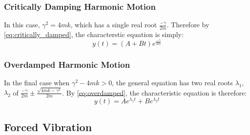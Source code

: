 \documentclass[11pt]{article} %
\begin{document}
\begin{multicols}{2}
\subsubsection {Critically Damping Harmonic Motion}
In this case, ${\gamma}^2 = 4mk$, which has a single real root $\frac{-\gamma}{2m}$. Therefore by \eqref{eq:critically_damped}, the characterstic equation is simply:
\begin{equation}
y(t) = (A + Bt)e^{{\frac{-\gamma}{2m}}}	
\end{equation}

\subsubsection {Overdamped Harmonic Motion}
In the final case when ${\gamma}^2 - 4mk > 0$, the general equation has two real roots ${\lambda}_1$, ${\lambda}_2$ of ${\frac{-\gamma}{2m}} \pm \frac{\sqrt{4mk - {\gamma}^2}}{2m}$. By \eqref{eq:overdamped}, the characteristic equation is therefore:
\begin{equation}
y(t) = Ae^{{\lambda}_1t} + Be^{{\lambda}_2t}
\end{equation}


\subsection {Forced Vibration}
\end{multicols}
\end{document}

